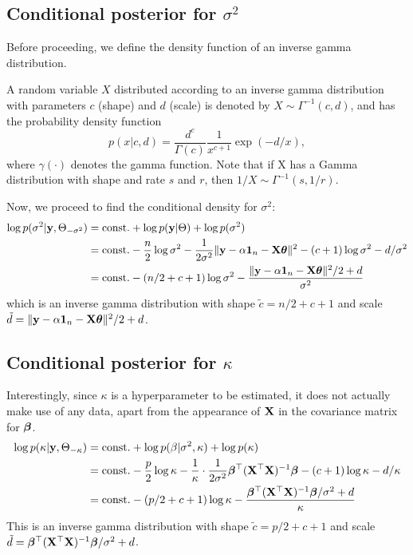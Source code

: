 \subsection{Conditional posterior for $\sigma^2$}

Before proceeding, we define the density function of an inverse gamma distribution.

\begin{definition}\label{def:invgam}
  A random variable $X$ distributed according to an inverse gamma distribution with parameters $c$ (shape) and $d$ (scale) is denoted by $X\sim\Gamma^{-1}(c,d)$, and has the probability density function 
  \[
    p(x|c,d) = \frac{d^c}{\Gamma(c)} \frac{1}{x^{c+1}}\exp(-d/x),
  \]
  where $\gamma(\cdot)$ denotes the gamma function.
  Note that if X has a Gamma distribution with shape and rate $s$ and $r$, then $1/X \sim \Gamma^{-1}(s,1/r)$.
\end{definition}

Now, we proceed to find the conditional density for $\sigma^2$:
\begin{align*}
  \log p(\sigma^2|\by,\Theta_{-\sigma^2}) 
  &= \const + \log p(\by|\Theta) + \log p(\sigma^2) \\
  &= \const - \half[n]\log\sigma^2 - \frac{1}{2\sigma^2} \Vert \by - \alpha \bone_n - \bX\btheta \Vert^2 - (c+1)\log\sigma^2 - d / \sigma^2 \\
  &= \const - (n/2 + c + 1)\log\sigma^2 - \frac{\Vert \by - \alpha \bone_n - \bX\btheta \Vert^2/2 + d}{\sigma^2}
\end{align*}
which is an inverse gamma distribution with shape $\tilde c = n/2 + c + 1$ and scale $\tilde d = \Vert \by - \alpha \bone_n - \bX\btheta \Vert^2/2 + d$.

\subsection{Conditional posterior for $\kappa$}

Interestingly, since $\kappa$ is a hyperparameter to be estimated, it does not actually make use of any data, apart from the appearance of $\bX$ in the covariance matrix for $\bbeta$.
\begin{align*}
  \log p(\kappa|\by,\Theta_{-\kappa}) &= \const + \log p(\beta|\sigma^2,\kappa) + \log p(\kappa) \\
  &= \const - \half[p]\log\kappa - \frac{1}{\kappa}\cdot\frac{1}{2\sigma^2} \bbeta^\top(\XTX)^{-1}\bbeta - (c+1)\log\kappa - d / \kappa \\
  &= \const - (p/2+c+1)\log\kappa - \frac{\bbeta^\top(\XTX)^{-1}\bbeta/\sigma^2+d}{\kappa}
\end{align*}
This is an inverse gamma distribution with shape $\tilde c = p/2 + c + 1$ and scale $\tilde d = \bbeta^\top(\XTX)^{-1}\bbeta/\sigma^2+d$.
